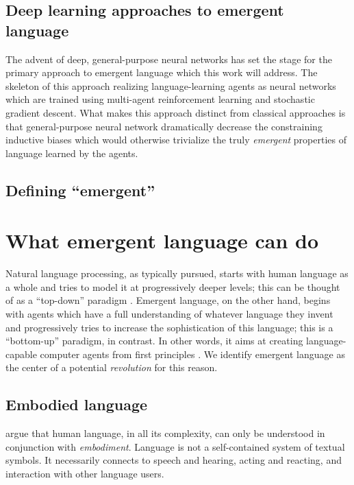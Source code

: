 \subsection{Deep learning approaches to emergent language}
The advent of deep, general-purpose neural networks has set the stage for the primary  approach to emergent language which this work will address.
The skeleton of this approach realizing language-learning agents as neural networks which are trained using multi-agent reinforcement learning and stochastic gradient descent.
What makes this approach distinct from classical approaches is that general-purpose neural network dramatically decrease the constraining inductive biases which would otherwise trivialize the truly \emph{emergent} properties of language learned by the agents.

\subsection{Defining ``emergent''}

\section{What emergent language can do}
Natural language processing, as typically pursued, starts with human language as a whole and tries to model it at progressively deeper levels; this can be thought of as a ``top-down'' paradigm .
Emergent language, on the other hand, begins with agents which have a full understanding of whatever language they invent and progressively tries to increase the sophistication of this language; this is a ``bottom-up'' paradigm, in contrast.
In other words, it aims at creating language-capable computer agents from first principles .
We identify emergent language as the center of a potential \emph{revolution} for this reason.


\subsection{Embodied language}
\citet{bisk_experience_2020} argue that human language, in all its complexity, can only be understood in conjunction with \emph{embodiment}.
Language is not a self-contained system of textual symbols. It necessarily connects to speech and hearing, acting and reacting, and interaction with other language users.
 

